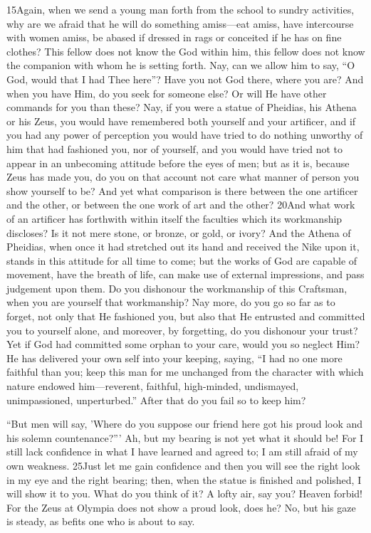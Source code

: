 15Again, when we send a young man forth from the school to sundry activities, why are we afraid that he will do something amiss—eat amiss, have intercourse with women amiss, be abased if dressed in rags or conceited if he has on fine clothes? This fellow does not know the God within him, this fellow does not know the companion with whom he is setting forth. Nay, can we allow him to say, ``O God, would that I had Thee here''? Have you not God there, where you are? And when you have Him, do you seek for someone else? Or will He have other commands for you than these? Nay, if you were a statue of Pheidias, his Athena or his Zeus, you would have remembered both yourself and your artificer, and if you had any power of perception you would have tried to do nothing unworthy of him that had fashioned you, nor of yourself, and you would have tried not to appear in an unbecoming attitude before the eyes of men; but as it is, because Zeus has made you, do you on that account not care what manner of person you show yourself to be? And yet what comparison is there between the one artificer and the other, or between the one work of art and the other? 20And what work of an artificer has forthwith within itself the faculties which its workmanship discloses? Is it not mere stone, or bronze, or gold, or ivory? And the Athena of Pheidias, when once it had stretched out its hand and received the Nike upon it, stands in this attitude for all time to come; but the works of God are capable of movement, have the breath of life, can make use of external impressions, and pass judgement upon them. Do you dishonour the workmanship of this Craftsman, when you are yourself that workmanship? Nay more, do you go so far as to forget, not only that He fashioned you, but also that He entrusted and committed you to yourself alone, and moreover, by forgetting, do you dishonour your trust? Yet if God had committed some orphan to your care, would you so neglect Him? He has delivered your own self into your keeping, saying, ``I had no one more faithful than you; keep this man for me unchanged from the character with which nature endowed him—reverent, faithful, high-minded, undismayed, unimpassioned, unperturbed.'' After that do you fail so to keep him?

``But men will say, 'Where do you suppose our friend here got his proud look and his solemn countenance?''' Ah, but my bearing is not yet what it should be! For I still lack confidence in what I have learned and agreed to; I am still afraid of my own weakness. 25Just let me gain confidence and then you will see the right look in my eye and the right bearing; then, when the statue is finished and polished, I will show it to you. What do you think of it? A lofty air, say you? Heaven forbid! For the Zeus at Olympia does not show a proud look, does he? No, but his gaze is steady, as befits one who is about to say.

